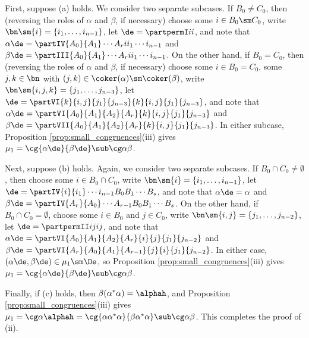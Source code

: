 First, suppose (a) holds.  We consider two separate subcases.  If $B_0\not=C_0$, then (reversing the roles of $\alpha$ and $\beta$, if necessary) choose some $i\in B_0\sm C_0$, write $\bn\sm\{i\}=\{i_1,\ldots,i_{n-1}\}$, let $\de=\partpermI ii$,
and note that $\alpha\de=\partIV{A_0}{A_1}\cdots{A_r}{i}{i_1}\cdots{i_{n-1}}$ and $\beta\de=\partIII{A_0}{A_1}\cdots{A_r}{i}{i_1}\cdots{i_{n-1}}$.
On the other hand, if $B_0=C_0$, then (reversing the roles of $\alpha$ and $\beta$, if necessary) choose some $i\in B_0=C_0$, some $j,k\in\bn$ with $(j,k)\in\coker(\alpha)\sm\coker(\beta)$, write $\bn\sm\{i,j,k\}=\{j_1,\ldots,j_{n-3}\}$, let $\de=\partVI{k}{i,j}{j_1}{j_{n-3}}{k}{i,j}{j_1}{j_{n-3}}$,
and note that $\alpha\de=\partVI{A_0}{A_1}{A_2}{A_r}{k}{i,j}{j_1}{j_{n-3}}$ and $\beta\de=\partVII{A_0}{A_1}{A_2}{A_r}{k}{i,j}{j_1}{j_{n-3}}$.
In either subcase, Proposition \ref{prop:small_congruences}(iii) gives $\mu_1=\cg{\alpha\de}{\beta\de}\sub\cg\alpha\beta$.

Next, suppose (b) holds.  Again, we consider two separate subcases.  If $B_0\cap C_0\not=\emptyset$, then choose some ${i\in B_0\cap C_0}$, write $\bn\sm\{i\}=\{i_1,\ldots,i_{n-1}\}$, let $\de=\partIV{i}{i_1}\cdots{i_{n-1}}{B_0}{B_1}\cdots{B_s}$,
and note that $\alpha\de=\alpha $ and $\beta\de=\partIV{A_r}{A_0}\cdots{A_{r-1}}{B_0}{B_1}\cdots{B_s}$.
On the other hand, if 
$B_0\cap C_0=\emptyset$, choose some $i\in B_0$ and $j\in C_0$, write $\bn\sm\{i,j\}=\{j_1,\ldots,j_{n-2}\}$, let 
$\de=\partpermII ijij$, 
and note that $\alpha\de=\partVI{A_0}{A_1}{A_2}{A_r}{i}{j}{j_1}{j_{n-2}}$ and $\beta\de=\partVI{A_r}{A_0}{A_1}{A_{r-1}}{j}{i}{j_1}{j_{n-2}}$.
In either case, $(\alpha\de,\beta\de)\in\mu_1\sm\De$, so Proposition \ref{prop:small_congruences}(iii) gives $\mu_1=\cg{\alpha\de}{\beta\de}\sub\cg\alpha\beta$.

Finally, if (c) holds, then $\beta(\alpha^*\alpha)=\alphah$, and Proposition \ref{prop:small_congruences}(iii) gives $\mu_1=\cg\alpha{\alphah}=\cg{\alpha\alpha^*\alpha}{\beta\alpha^*\alpha}\sub\cg\alpha\beta$.
%
This completes the proof of (ii).

